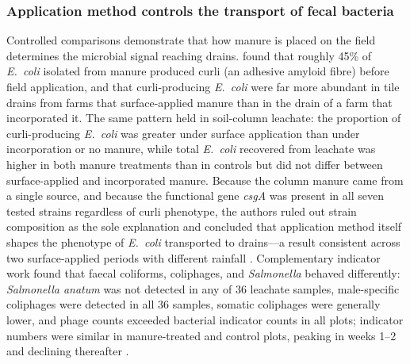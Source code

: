 \subsubsection{Application method controls the transport of fecal bacteria}
Controlled comparisons demonstrate that how manure is placed on the field determines the microbial signal reaching drains. \textcite{Truhlar2015} found that roughly 45\% of \textit{E.\ coli} isolated from manure produced curli (an adhesive amyloid fibre) before field application, and that curli-producing \textit{E.\ coli} were far more abundant in tile drains from farms that surface-applied manure than in the drain of a farm that incorporated it. The same pattern held in soil-column leachate: the proportion of curli-producing \textit{E.\ coli} was greater under surface application than under incorporation or no manure, while total \textit{E.\ coli} recovered from leachate was higher in both manure treatments than in controls but did not differ between surface-applied and incorporated manure. Because the column manure came from a single source, and because the functional gene \textit{csgA} was present in all seven tested strains regardless of curli phenotype, the authors ruled out strain composition as the sole explanation and concluded that application method itself shapes the phenotype of \textit{E.\ coli} transported to drains---a result consistent across two surface-applied periods with different rainfall \parencite{Truhlar2015}. Complementary indicator work found that faecal coliforms, coliphages, and \textit{Salmonella} behaved differently: \textit{Salmonella anatum} was not detected in any of 36 leachate samples, male-specific coliphages were detected in all 36 samples, somatic coliphages were generally lower, and phage counts exceeded bacterial indicator counts in all plots; indicator numbers were similar in manure-treated and control plots, peaking in weeks 1--2 and declining thereafter \parencite{Malik2004}.

